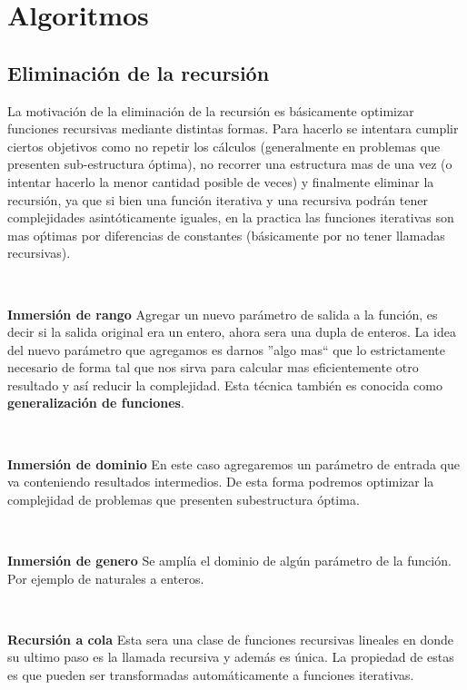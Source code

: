 \chapter{Algoritmos}

\section{Eliminaci\'on de la recursi\'on}

La motivaci\'on de la eliminaci\'on de la recursi\'on es b\'asicamente optimizar funciones recursivas mediante distintas formas. Para hacerlo se intentara cumplir ciertos objetivos como no repetir los c\'alculos (generalmente en problemas que presenten sub-estructura \'optima), no recorrer una estructura mas de una vez (o intentar hacerlo la menor cantidad posible de veces) y finalmente eliminar la recursi\'on, ya que si bien una funci\'on iterativa y una recursiva podr\'an tener complejidades asint\'oticamente iguales, en la practica las funciones iterativas son mas o\'ptimas por diferencias de constantes (b\'asicamente por no tener llamadas recursivas).

~

\textbf{Inmersi\'on de rango} Agregar un nuevo par\'ametro de salida a la funci\'on, es decir si la salida original era un entero, ahora sera una dupla de enteros. La idea del nuevo par\'ametro que agregamos es darnos ''algo mas`` que lo estrictamente necesario de forma tal que nos sirva para calcular mas eficientemente otro resultado y as\'i reducir la complejidad. Esta t\'ecnica tambi\'en es conocida como \textbf{generalizaci\'on de funciones}.

~

\textbf{Inmersi\'on de dominio} En este caso agregaremos un par\'ametro de entrada que va conteniendo resultados intermedios. De esta forma podremos optimizar la complejidad de problemas que presenten subestructura \'optima.

~

\textbf{Inmersi\'on de genero} Se ampl\'ia el dominio de alg\'un par\'ametro de la funci\'on. Por ejemplo de naturales a enteros.

~

\textbf{Recursi\'on a cola} Esta sera una clase de funciones recursivas lineales en donde su ultimo paso es la llamada recursiva y adem\'as es \'unica. La propiedad de estas es que pueden ser transformadas autom\'aticamente a funciones iterativas.

~

